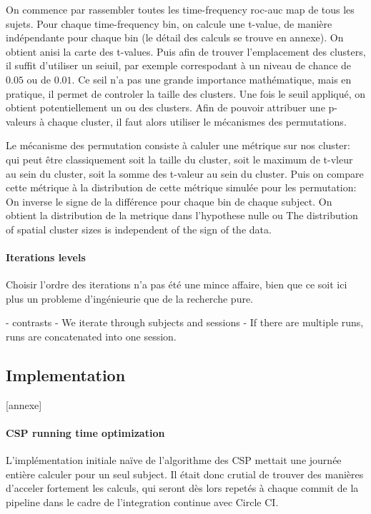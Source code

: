 On commence par rassembler toutes les time-frequency roc-auc map de tous les sujets. Pour chaque time-frequency bin, on calcule une t-value, de manière indépendante pour chaque bin (le détail des calculs se trouve en annexe). On obtient anisi la carte des t-values. Puis afin de trouver l'emplacement des clusters, il suffit d'utiliser un seiuil, par exemple correspodant à un niveau de chance de $0.05$ ou de $0.01$. Ce seil n'a pas une grande importance mathématique, mais en pratique, il permet de controler la taille des clusters. Une fois le seuil appliqué, on obtient potentiellement un ou des clusters. Afin de pouvoir attribuer une p-valeurs à chaque cluster, il faut alors utiliser le mécanismes des permutations.

Le mécanisme des permutation consiste à caluler une métrique sur nos cluster: qui peut être classiquement soit la taille du cluster, soit le maximum de t-vleur au sein du cluster, soit la somme des t-valeur au sein du cluster. Puis on compare cette métrique à la distribution de cette métrique simulée pour les permutation:
On inverse le signe de la différence pour chaque bin de chaque subject. On obtient la distribution de la metrique dans l'hypothese nulle ou The distribution of spatial cluster sizes is independent of the sign of the data.




\paragraph{Iterations levels}

Choisir l'ordre des iterations n'a pas été une mince affaire, bien que ce soit ici plus un probleme d'ingénieurie que de la recherche pure.

- contrasts
- We iterate through subjects and sessions
- If there are multiple runs, runs are concatenated into one session.


\subsection{Implementation}

[annexe]

\paragraph{CSP running time optimization}

L'implémentation initiale naïve de l'algorithme des CSP mettait une journée entière calculer pour un seul subject. Il était donc crutial de trouver des manières d'acceler fortement les calculs, qui seront dès lors repetés à chaque commit de la pipeline dans le cadre de l'integration continue avec Circle CI.

